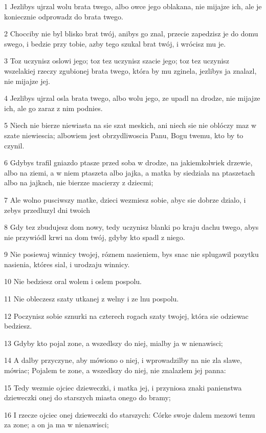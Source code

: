 \par 1 Jezlibys ujrzal wolu brata twego, albo owce jego oblakana, nie mijajze ich, ale je koniecznie odprowadz do brata twego.
\par 2 Chocciby nie byl blisko brat twój, anibys go znal, przecie zapedzisz je do domu swego, i bedzie przy tobie, azby tego szukal brat twój, i wrócisz mu je.
\par 3 Toz uczynisz oslowi jego; toz tez uczynisz szacie jego; toz tez uczynisz wszelakiej rzeczy zgubionej brata twego, która by mu zginela, jezlibys ja znalazl, nie mijajze jej.
\par 4 Jezlibys ujrzal osla brata twego, albo wolu jego, ze upadl na drodze, nie mijajze ich, ale go zaraz z nim podnies.
\par 5 Niech nie bierze niewiasta na sie szat meskich, ani niech sie nie oblóczy maz w szate niewiescia; albowiem jest obrzydliwoscia Panu, Bogu twemu, kto by to czynil.
\par 6 Gdybys trafil gniazdo ptasze przed soba w drodze, na jakiemkolwiek drzewie, albo na ziemi, a w niem ptaszeta albo jajka, a matka by siedziala na ptaszetach albo na jajkach, nie bierzze macierzy z dziecmi;
\par 7 Ale wolno pusciwszy matke, dzieci wezmiesz sobie, abyc sie dobrze dzialo, i zebys przedluzyl dni twoich
\par 8 Gdy tez zbudujesz dom nowy, tedy uczynisz blanki po kraju dachu twego, abys nie przywiódl krwi na dom twój, gdyby kto spadl z niego.
\par 9 Nie posiewaj winnicy twojej, róznem nasieniem, bys snac nie splugawil pozytku nasienia, któres sial, i urodzaju winnicy.
\par 10 Nie bedziesz oral wolem i oslem pospolu.
\par 11 Nie obleczesz szaty utkanej z welny i ze lnu pospolu.
\par 12 Poczynisz sobie sznurki na czterech rogach szaty twojej, która sie odziewac bedziesz.
\par 13 Gdyby kto pojal zone, a wszedlszy do niej, mialby ja w nienawisci;
\par 14 A dalby przyczyne, aby mówiono o niej, i wprowadzilby na nie zla slawe, mówiac; Pojalem te zone, a wszedlszy do niej, nie znalazlem jej panna:
\par 15 Tedy wezmie ojciec dzieweczki, i matka jej, i przyniosa znaki panienstwa dzieweczki onej do starszych miasta onego do bramy;
\par 16 I rzecze ojciec onej dzieweczki do starszych: Córke swoje dalem mezowi temu za zone; a on ja ma w nienawisci;
